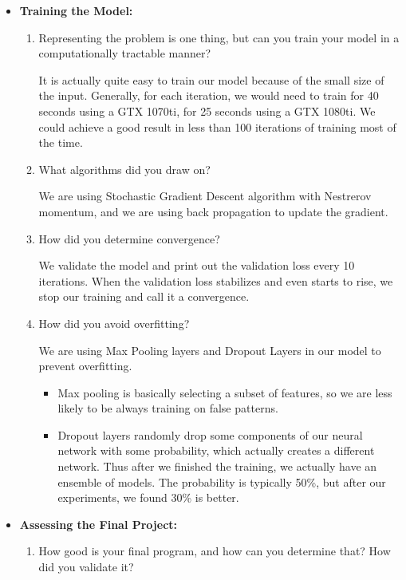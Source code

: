 \documentclass[letter]{article}
\begin{document}
\begin{itemize}
\begin{enumerate}
\begin{itemize}
		\end{itemize}
	\end{enumerate}
	\item {\textbf{Training the Model:}} 
	\begin{enumerate}
		\item{Representing the problem is one thing, but can you train your model in a computationally tractable manner?}
		\par{It is actually quite easy to train our model because of the small size of the input. Generally, for each iteration, we would need to train for 40 seconds using a GTX 1070ti, for 25 seconds using a GTX 1080ti. We could achieve a good result in less than 100 iterations of training most of the time.}
		\item{What algorithms did you draw on?}
		\par{We are using Stochastic Gradient Descent algorithm with Nestrerov momentum, and we are using back propagation to update the gradient.}
		\item{How did you determine convergence?}
		\par{We validate the model and print out the validation loss every 10 iterations. When the validation loss stabilizes and even starts to rise, we stop our training and call it a convergence.}
		\item{How did you avoid overfitting?}
		\par{We are using Max Pooling layers and Dropout Layers in our model to prevent overfitting.}
		\begin{itemize}
			\item {Max pooling is basically selecting a subset of features, so we are less likely to be always training on false patterns.}
			\item {Dropout layers randomly drop some components of our neural network with some probability, which actually creates a different network. Thus after we finished the training, we actually have an ensemble of models. The probability is typically 50\%, but after our experiments, we found 30\% is better.}
		\end{itemize}
	\end{enumerate}
	\item {\textbf{Assessing the Final Project:}} 
	\begin{enumerate}
		\item {How good is your final program, and how can you determine that? How
			did you validate it?}
		\begin{figure}
			\centering

\end{figure}
\end{enumerate}
\end{itemize}
\end{document}
